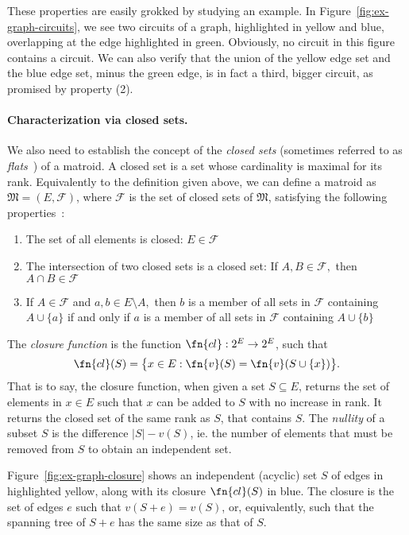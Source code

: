 These properties are easily grokked by studying an example. In Figure~\ref{fig:ex-graph-circuits}, we see two circuits of a graph, highlighted in yellow and blue, overlapping at the edge highlighted in green. Obviously, no circuit in this figure contains a circuit. We can also verify that the union of the yellow edge set and the blue edge set, minus the green edge, is in fact a third, bigger circuit, as promised by property (2).

\paragraph{Characterization via closed sets.} We also need to establish the concept of the \textit{closed sets} (sometimes referred to as \textit{flats}~\cite{schrijver-2003}) of a matroid. A closed set is a set whose cardinality is maximal for its rank. Equivalently to the definition given above, we can define a matroid as $\mathfrak{M} = (E, \mathcal{F})$, where $\mathcal{F}$ is the set of closed sets of $\mathfrak{M}$, satisfying the following properties~\cite{knuth-1975}:

\begin{enumerate}
  \item The set of all elements is closed: $E \in \mathcal{F}$
  \item The intersection of two closed sets is a closed set: If $A,B \in \mathcal{F},$ then $A \cap B \in \mathcal{F}$
  \item If $A \in \mathcal{F}$ and $a,b \in E \setminus A,$ then $b$ is a member of all sets in $\mathcal{F}$ containing $A \cup \{a\}$ if and only if $a$ is a member of all sets in $\mathcal{F}$ containing $A \cup \{b\}$
\end{enumerate}

The \textit{closure function} is the function $\fn{cl} : 2^E \to 2^E$, such that $$\fn{cl}(S) = \bigl\{ x \in E : \fn{v}(S) = \fn{v}(S \cup \{x\}) \bigr\}.$$ That is to say, the closure function, when given a set $S \subseteq E$, returns the set of elements in $x \in E$ such that $x$ can be added to $S$ with no increase in rank. It returns the closed set of the same rank as $S$, that contains $S$. The \textit{nullity} of a subset $S$ is the difference $|S| - v(S)$, ie. the number of elements that must be removed from $S$ to obtain an independent set.

Figure~\ref{fig:ex-graph-closure} shows an independent (acyclic) set $S$ of edges in highlighted yellow, along with its closure $\fn{cl}(S)$ in blue. The closure is the set of edges $e$ such that $v(S+e) = v(S)$, or, equivalently, such that the spanning tree of $S+e$ has the same size as that of $S$.

